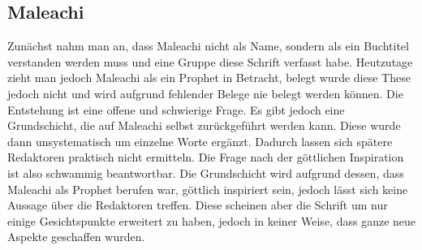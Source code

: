 \subsection*{Maleachi}
Zunächst nahm man an, dass Maleachi nicht als Name, sondern als ein Buchtitel verstanden werden muss und eine Gruppe diese Schrift verfasst habe. Heutzutage zieht man jedoch Maleachi als ein Prophet in Betracht, belegt wurde diese These jedoch nicht und wird aufgrund fehlender Belege nie belegt werden können. Die Entstehung ist eine offene und schwierige Frage. Es gibt jedoch eine Grundschicht, die auf Maleachi selbst zurückgeführt werden kann. Diese wurde dann unsystematisch um einzelne Worte ergänzt. Dadurch lassen sich spätere Redaktoren praktisch nicht ermitteln. Die Frage nach der göttlichen Inspiration ist also schwammig beantwortbar. Die Grundschicht wird aufgrund dessen, dass Maleachi als Prophet berufen war, göttlich inspiriert sein, jedoch lässt sich keine Aussage über die Redaktoren treffen. Diese scheinen aber die Schrift um nur einige Gesichtspunkte erweitert zu haben, jedoch in keiner Weise, dass ganze neue Aspekte geschaffen wurden.
\pagebreak

